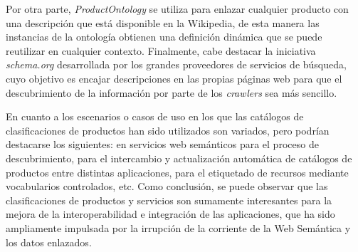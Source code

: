 Por otra parte, \textit{ProductOntology} se utiliza para enlazar cualquier producto con una descripción
que está disponible en la Wikipedia, de esta manera las instancias de la ontología obtienen una
definición dinámica que se puede reutilizar en cualquier contexto. Finalmente, cabe destacar
la iniciativa \textit{schema.org} desarrollada por los grandes proveedores de servicios de búsqueda, 
cuyo objetivo es encajar descripciones en las propias páginas web para que el descubrimiento
de la información por parte de los \textit{crawlers} sea más sencillo.

En cuanto a los escenarios o casos de uso en los que las catálogos de clasificaciones de productos
han sido utilizados son variados, pero podrían destacarse los siguientes: en servicios web semánticos
para el proceso de descubrimiento, para el intercambio y actualización automática de catálogos
de productos entre distintas aplicaciones, para el etiquetado de recursos mediante vocabularios
controlados, etc. Como conclusión, se puede observar que las clasificaciones de productos y servicios son sumamente interesantes
para la mejora de la interoperabilidad e integración de las aplicaciones, que ha sido ampliamente impulsada por la irrupción de la corriente 
de la Web Semántica y los datos enlazados.




